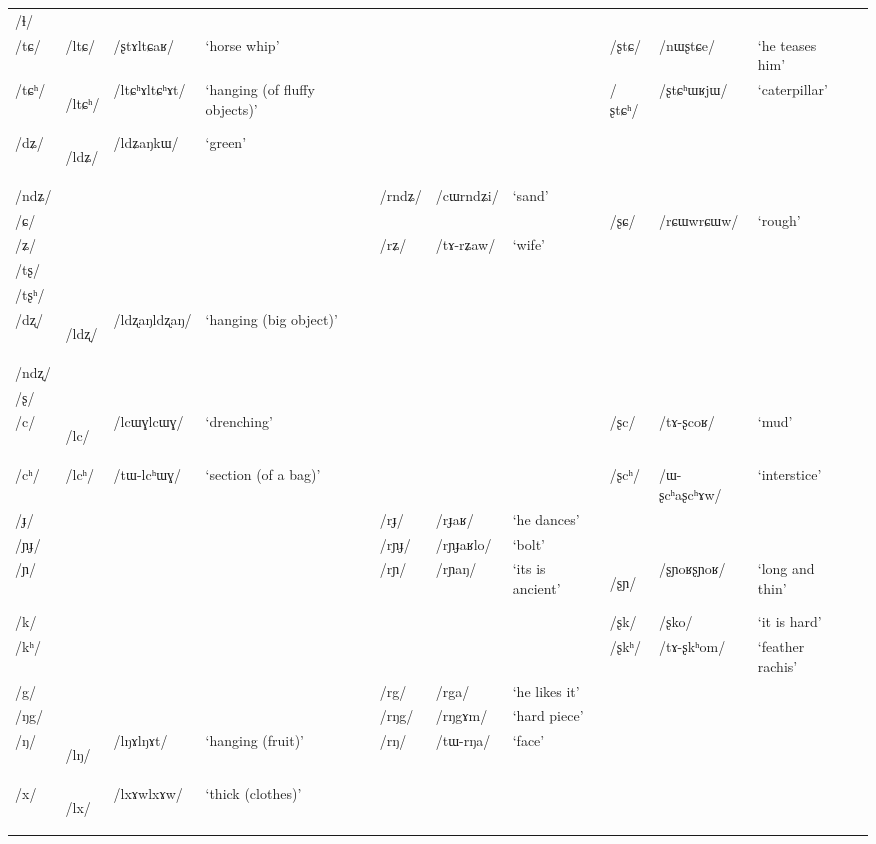 \documentclass[oneside,a4paper,11pt]{article}
\newcommand{\ipa}[1]{\mbox{\phon/#1/}}
\newcommand{\deux}[1]{\ipa{#1}\addtocounter{2clusters}{1}}
\newcommand{\tib}[1]{\cellcolor{lightgray}\textbf{#1}}
\newcommand{\idph}[1]{\cellcolor{gray}\textbf{#1}}
\begin{document}
\begin{table}
{\begin{tabular}{lllllllllll}
\ipa{ɬ} & & & & & & & & & & \\ 
\ipa{tɕ} & \deux{ltɕ} & \ipa{ʂtɤltɕaʁ} & `horse whip' & & & & \deux{ʂtɕ} & \ipa{nɯʂtɕe} & `he teases him' & \\ 
\ipa{tɕʰ} & \deux{ltɕʰ} \idph{} & \ipa{ltɕʰɤltɕʰɤt} & `hanging (of fluffy objects)' & & & & \deux{ʂtɕʰ} & \ipa{ʂtɕʰɯʁjɯ} & `caterpillar' & \\ 
\ipa{dʑ} & \deux{ldʑ} \tib{} & \ipa{ldʑaŋkɯ} & `green' & & & & & & & \\ 
\ipa{ndʑ} & & & & \deux{rndʑ} & \ipa{cɯrndʑi} & `sand' & & & & \\ 
\ipa{ɕ} & & & & & & & \deux{ʂɕ} & \ipa{rɕɯwrɕɯw} & `rough' & \\ 
\ipa{ʑ} & & & & \deux{rʑ} & \ipa{tɤ-rʑaw} & `wife' & & & & \\ 
\ipa{tʂ} & & & & & & & & & & \\ 
\ipa{tʂʰ} & & & & & & & & & & \\ 
\ipa{dʐ} & \deux{ldʐ} \idph{} & \ipa{ldʐaŋldʐaŋ} & `hanging (big object)' & & & & & & & \\ 
\ipa{ndʐ} & & & & & & & & & & \\ 
\ipa{ʂ} & & & & & & & & & & \\ 
\ipa{c} & \deux{lc} \idph{} & \ipa{lcɯɣlcɯɣ} & `drenching' & & & & \deux{ʂc} & \ipa{tɤ-ʂcoʁ} & `mud' & \\ 
\ipa{cʰ} & \deux{lcʰ} & \ipa{tɯ-lcʰɯɣ} & `section (of a bag)' & & & & \deux{ʂcʰ} & \ipa{ɯ-ʂcʰaʂcʰɤw} & `interstice' & \\ 
\ipa{ɟ} & & & & \deux{rɟ} & \ipa{rɟaʁ} & `he dances' & & & & \\ 
\ipa{ɲɟ} & & & & \deux{rɲɟ} & \ipa{rɲɟaʁlo} & `bolt' & & & & \\ 
\ipa{ɲ} & & & & \deux{rɲ} & \ipa{rɲaŋ} & `its is ancient' & \deux{ʂɲ} \idph{} & \ipa{ʂɲoʁʂɲoʁ} & `long and thin' & \\ 
\ipa{k} & & & & & & & \deux{ʂk} & \ipa{ʂko} & `it is hard' & \\ 
\ipa{kʰ} & & & & & & & \deux{ʂkʰ} & \ipa{tɤ-ʂkʰom} & `feather rachis' & \\ 
\ipa{g} & & & & \deux{rg} & \ipa{rga} & `he likes it' & & & & \\ 
\ipa{ŋg} & & & & \deux{rŋg} & \ipa{rŋgɤm} & `hard piece' & & & & \\ 
\ipa{ŋ} & \deux{lŋ} \idph{} & \ipa{lŋɤlŋɤt} & `hanging (fruit)' & \deux{rŋ} & \ipa{tɯ-rŋa} & `face' & & & & \\ 
\ipa{x} & \deux{lx} \idph{} & \ipa{lxɤwlxɤw} & `thick (clothes)' & & & & & & & \\ 

\end{tabular}}
\end{table}
\end{document}
